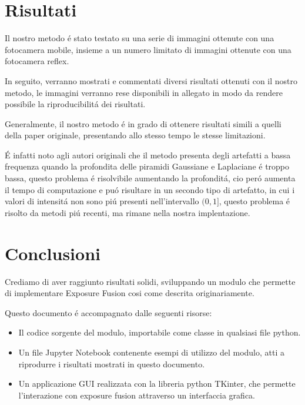 \documentclass[10pt,journal,cspaper,compsoc]{IEEEtran}
\begin{document}
\section{Risultati}

Il nostro metodo é stato testato su una serie di immagini ottenute con una fotocamera mobile, insieme 
a un numero limitato di immagini ottenute con una fotocamera reflex. 

In seguito, verranno mostrati e commentati diversi risultati ottenuti con il nostro metodo, le immagini 
verranno rese disponibili in allegato in modo da rendere possibile la riproducibilitá dei risultati.

Generalmente, il nostro metodo é in grado di ottenere risultati simili a quelli della paper originale, 
presentando allo stesso tempo le stesse limitazioni.

É infatti noto agli autori originali che il metodo 
presenta degli artefatti a bassa frequenza quando la profondita delle piramidi Gaussiane e Laplaciane é troppo 
bassa, questo problema é risolvibile aumentando la profonditá, cio peró aumenta il tempo di computazione e 
puó risultare in un secondo tipo di artefatto, in cui i valori di intensitá non sono piú presenti nell'intervallo $(0, 1]$, 
questo problema é risolto da metodi piú recenti\cite{hessel:exp_fusion}, ma rimane nella nostra implentazione.

\section{Conclusioni}

Crediamo di aver raggiunto risultati solidi, sviluppando un modulo che permette di implementare Exposure Fusion 
cosi come descrita originariamente. 

Questo documento é accompagnato dalle seguenti risorse:

\begin{itemize}
    \item Il codice sorgente del modulo, importabile come classe in qualsiasi file python.
    \item Un file Jupyter Notebook contenente esempi di utilizzo del modulo, atti a riprodurre 
    i risultati mostrati in questo documento.
    \item Un applicazione GUI realizzata con la libreria python TKinter, che permette l'interazione     
    con exposure fusion attraverso un interfaccia grafica.
\end{itemize}



\end{document}
